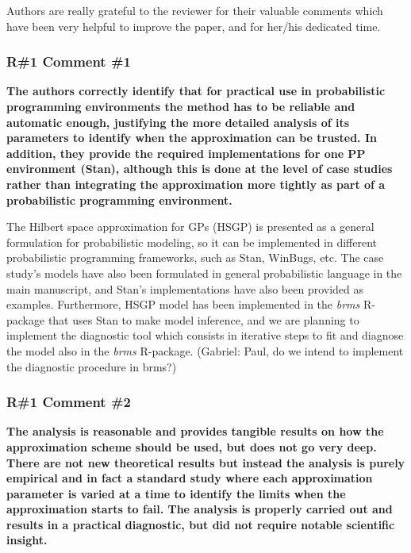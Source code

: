 \documentclass[11pt]{report}
\begin{document}
Authors are really grateful to the reviewer for their valuable comments which have been very helpful to improve the paper, and for her/his dedicated time.

\subsubsection*{R\#1 Comment \#1}

\textbf{The authors correctly identify that for practical use in probabilistic programming environments the method has to be reliable and automatic enough, justifying the more detailed analysis of its parameters to identify when the approximation can be trusted. In addition, they provide the required implementations for one PP environment (Stan), although this is done at the level of case studies rather than integrating the approximation more tightly as part of a probabilistic programming environment.}

The Hilbert space approximation for GPs (HSGP) is presented as a general formulation for probabilistic modeling, so it can be implemented in different probabilistic programming frameworks, such as Stan, WinBugs, etc. The case study's models have also been formulated in general probabilistic language in the main manuscript, and Stan's implementations have also been provided as examples. Furthermore, HSGP model has been implemented in the \textit{brms} R-package that uses Stan to make model inference, and we are planning to implement the diagnostic tool which consists in iterative steps to fit and diagnose the model also in the \textit{brms} R-package. {\color{blue}(Gabriel: Paul, do we intend to implement the diagnostic procedure in brms?)}
 

\subsubsection*{R\#1 Comment \#2}

\textbf{The analysis is reasonable and provides tangible results on how the approximation scheme should be used, but does not go very deep. There are not new theoretical results but instead the analysis is purely empirical and in fact a standard study where each approximation parameter is varied at a time to identify the limits when the approximation starts to fail. The analysis is properly carried out and results in a practical diagnostic, but did not require notable scientific insight.}
\end{document}

